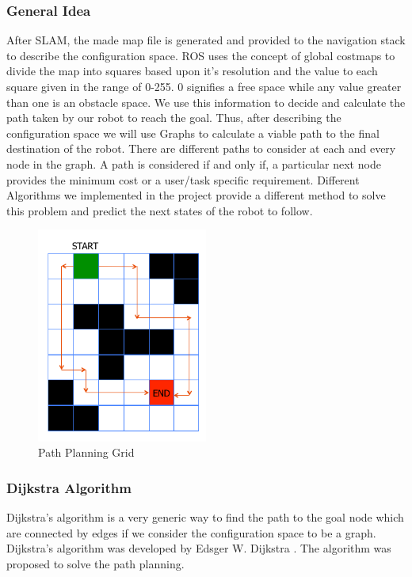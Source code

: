 \subsubsection{General Idea}
After SLAM, the made map file is generated and provided to the navigation stack to describe the configuration space.
ROS uses the concept of global costmaps to divide the map into squares based upon it's resolution and the value to each square given in the range of 0-255.
0 signifies a free space while any value greater than one is an obstacle space. We use this information to decide and calculate the path taken by our robot to reach the goal.
Thus, after describing the configuration space we will use Graphs to calculate a viable path to the final destination of the robot.
There are different paths to consider at each and every node in the graph. A path is considered if and only if, a particular next node provides the minimum cost or a user/task specific requirement.
Different Algorithms we implemented in the project provide a different method to solve this problem and predict the next states of the robot to follow.
\begin{figure}[th]
    \centering
    \includegraphics[width=0.5\textwidth]{Figures/grid-path-planning.png}
    \decoRule
    \caption[]{Path Planning Grid}
    \label{fig:PPGrid}
\end{figure}

\subsubsection{Dijkstra Algorithm}
Dijkstra's algorithm is a very generic way to find the path to the goal node which are connected by edges if we consider the configuration space to be a graph. Dijkstra's algorithm was developed by Edsger W. Dijkstra \cite{enwiki:1039157161}. The algorithm
was proposed to solve the path planning. 
